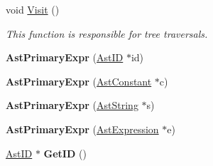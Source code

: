 \begin{DoxyCompactItemize}
\item 
void \hyperlink{classAstPrimaryExpr_adfc316933183cada2963b7b855ddb824}{Visit} ()
\begin{DoxyCompactList}\small\item\em This function is responsible for tree traversals. \end{DoxyCompactList}\item 
\hypertarget{classAstPrimaryExpr_a92ac6a98d42e522c7476768c959e2044}{{\bfseries Ast\-Primary\-Expr} (\hyperlink{classAstID}{Ast\-I\-D} $\ast$id)}\label{classAstPrimaryExpr_a92ac6a98d42e522c7476768c959e2044}

\item 
\hypertarget{classAstPrimaryExpr_a03809c945a11ab5345f50956cff84f82}{{\bfseries Ast\-Primary\-Expr} (\hyperlink{classAstConstant}{Ast\-Constant} $\ast$c)}\label{classAstPrimaryExpr_a03809c945a11ab5345f50956cff84f82}

\item 
\hypertarget{classAstPrimaryExpr_a784c92261d262fe4952963af0dd891e7}{{\bfseries Ast\-Primary\-Expr} (\hyperlink{classAstString}{Ast\-String} $\ast$s)}\label{classAstPrimaryExpr_a784c92261d262fe4952963af0dd891e7}

\item 
\hypertarget{classAstPrimaryExpr_a75b1363ac6a376ea3de63e03700072d8}{{\bfseries Ast\-Primary\-Expr} (\hyperlink{classAstExpression}{Ast\-Expression} $\ast$e)}\label{classAstPrimaryExpr_a75b1363ac6a376ea3de63e03700072d8}

\item 
\hypertarget{classAstPrimaryExpr_a0c5a0ec5399baf9dd319ba0f77e9111e}{\hyperlink{classAstID}{Ast\-I\-D} $\ast$ {\bfseries Get\-I\-D} ()}\label{classAstPrimaryExpr_a0c5a0ec5399baf9dd319ba0f77e9111e}


\end{DoxyCompactItemize}
